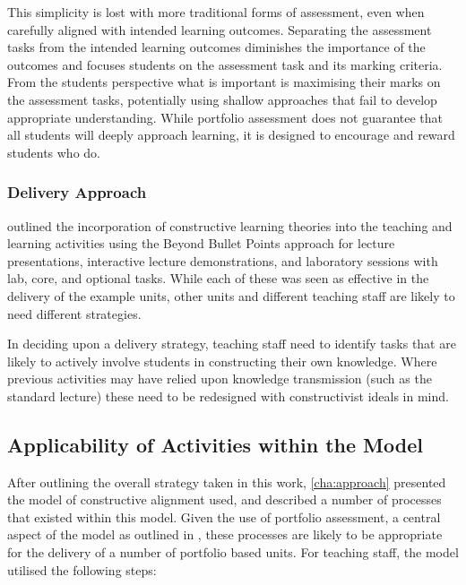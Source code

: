 This simplicity is lost with more traditional forms of assessment, even when carefully aligned with intended learning outcomes. Separating the assessment tasks from the intended learning outcomes diminishes the importance of the outcomes and focuses students on the assessment task and its marking criteria. From the students perspective what is important is maximising their marks on the assessment tasks, potentially using shallow approaches that fail to develop appropriate understanding. While portfolio assessment does not guarantee that all students will deeply approach learning, it is designed to encourage and reward students who do.


\subsubsection{Delivery Approach} %
\label{ssub:delivery_approach}

 outlined the incorporation of constructive learning theories into the teaching and learning activities using the Beyond Bullet Points approach for lecture presentations, interactive lecture demonstrations, and laboratory sessions with lab, core, and  optional tasks. While each of these was seen as effective in the delivery of the example units, other units and different teaching staff are likely to need different strategies. 

In deciding upon a delivery strategy, teaching staff need to identify tasks that are likely to actively involve students in constructing their own knowledge. Where previous activities may have relied upon knowledge transmission (such as the standard lecture) these need to be redesigned with constructivist ideals in mind.



\subsection{Applicability of Activities within the Model} %
\label{sub:processes_within_the_model}

After outlining the overall strategy taken in this work, \cref{cha:approach} presented the model of constructive alignment used, and described a number of processes that existed within this model. Given the use of portfolio assessment, a central aspect of the model as outlined in , these processes are likely to be appropriate for the delivery of a number of portfolio based units. For teaching staff, the model utilised the following steps:

